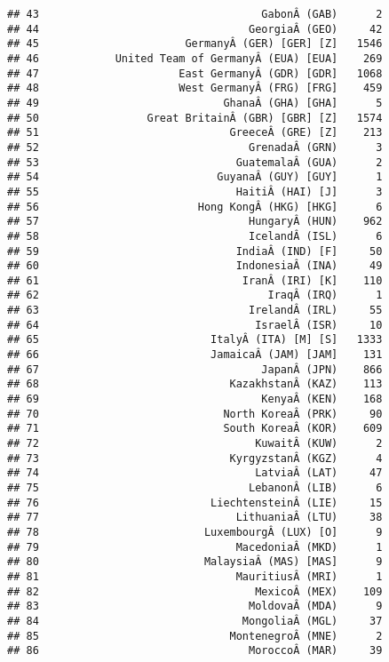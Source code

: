 \documentclass[
]{article}
\begin{document}
\begin{verbatim}
## 43                                   GabonÂ (GAB)      2
## 44                                 GeorgiaÂ (GEO)     42
## 45                       GermanyÂ (GER) [GER] [Z]   1546
## 46            United Team of GermanyÂ (EUA) [EUA]    269
## 47                      East GermanyÂ (GDR) [GDR]   1068
## 48                      West GermanyÂ (FRG) [FRG]    459
## 49                             GhanaÂ (GHA) [GHA]      5
## 50                 Great BritainÂ (GBR) [GBR] [Z]   1574
## 51                              GreeceÂ (GRE) [Z]    213
## 52                                 GrenadaÂ (GRN)      3
## 53                               GuatemalaÂ (GUA)      2
## 54                            GuyanaÂ (GUY) [GUY]      1
## 55                               HaitiÂ (HAI) [J]      3
## 56                         Hong KongÂ (HKG) [HKG]      6
## 57                                 HungaryÂ (HUN)    962
## 58                                 IcelandÂ (ISL)      6
## 59                               IndiaÂ (IND) [F]     50
## 60                               IndonesiaÂ (INA)     49
## 61                                IranÂ (IRI) [K]    110
## 62                                    IraqÂ (IRQ)      1
## 63                                 IrelandÂ (IRL)     55
## 64                                  IsraelÂ (ISR)     10
## 65                           ItalyÂ (ITA) [M] [S]   1333
## 66                           JamaicaÂ (JAM) [JAM]    131
## 67                                   JapanÂ (JPN)    866
## 68                              KazakhstanÂ (KAZ)    113
## 69                                   KenyaÂ (KEN)    168
## 70                             North KoreaÂ (PRK)     90
## 71                             South KoreaÂ (KOR)    609
## 72                                  KuwaitÂ (KUW)      2
## 73                              KyrgyzstanÂ (KGZ)      4
## 74                                  LatviaÂ (LAT)     47
## 75                                 LebanonÂ (LIB)      6
## 76                           LiechtensteinÂ (LIE)     15
## 77                               LithuaniaÂ (LTU)     38
## 78                          LuxembourgÂ (LUX) [O]      9
## 79                               MacedoniaÂ (MKD)      1
## 80                          MalaysiaÂ (MAS) [MAS]      9
## 81                               MauritiusÂ (MRI)      1
## 82                                  MexicoÂ (MEX)    109
## 83                                 MoldovaÂ (MDA)      9
## 84                                MongoliaÂ (MGL)     37
## 85                              MontenegroÂ (MNE)      2
## 86                                 MoroccoÂ (MAR)     39

\end{verbatim}
\end{document}
